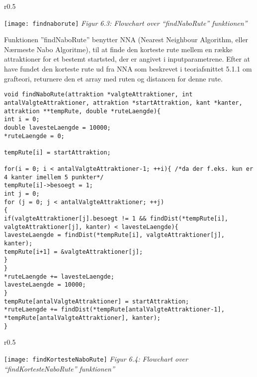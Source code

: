 \begin{wrapfigure}{r}{0.5\textwidth}
	\vspace{0pt}
	\begin{center}
		\texttt{[image: findnaborute]}\newline
		\textit{Figur 6.3: Flowchart over “findNaboRute” funktionen”}
	\end{center}
	\vspace{0pt}
	\vspace{0pt}
\end{wrapfigure}

Funktionen ”findNaboRute” benytter NNA (Nearest Neighbour Algorithm, eller Nærmeste Nabo Algoritme), til at finde den korteste rute mellem en række attraktioner for et bestemt startsted, der er angivet i inputparametrene. Efter at have fundet den korteste rute ud fra NNA som beskrevet i teoriafsnittet 5.1.1 om grafteori, returnere den et array med ruten og distancen for denne rute. \newline

\begin{lstlisting}
void findNaboRute(attraktion *valgteAttraktioner, int antalValgteAttraktioner, attraktion *startAttraktion, kant *kanter, attraktion **tempRute, double *ruteLaengde){
int i = 0;
double lavesteLaengde = 10000;
*ruteLaengde = 0;

tempRute[i] = startAttraktion;

for(i = 0; i < antalValgteAttraktioner-1; ++i){ /*da der f.eks. kun er 4 kanter imellem 5 punkter*/
tempRute[i]->besoegt = 1;
int j = 0;
for (j = 0; j < antalValgteAttraktioner; ++j)
{
if(valgteAttraktioner[j].besoegt != 1 && findDist(*tempRute[i], valgteAttraktioner[j], kanter) < lavesteLaengde){
lavesteLaengde = findDist(*tempRute[i], valgteAttraktioner[j], kanter);
tempRute[i+1] = &valgteAttraktioner[j];
}
}
*ruteLaengde += lavesteLaengde;
lavesteLaengde = 10000;
}
tempRute[antalValgteAttraktioner] = startAttraktion;
*ruteLaengde += findDist(*tempRute[antalValgteAttraktioner-1], *tempRute[antalValgteAttraktioner], kanter);
}
\end{lstlisting}

\begin{wrapfigure}{r}{0.5\textwidth}
	\vspace{0pt}
	\begin{center}
		\texttt{[image: findKortesteNaboRute]}\newline
		\textit{Figur 6.4: Flowchart over “findKortesteNaboRute” funktionen”}
	\end{center}
	\vspace{0pt}
	\vspace{0pt}
\end{wrapfigure}

